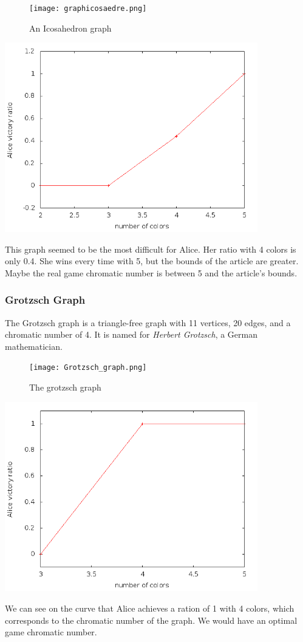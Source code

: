 \begin{figure}[h]
\begin{center}  
	\texttt{[image: graphicosaedre.png]}
\end{center}
    \caption{An Icosahedron graph}
    \label{icograph}
\end{figure}

\includegraphics[width=11cm]{resultats/icosaedre.png}

This graph seemed to be the most difficult for Alice. Her ratio with 4 colors is only 0.4. She wins every time with 5, but the bounds of the article are greater. Maybe the real game chromatic number is between 5 and the article's bounds.

\subsubsection{Grotzsch Graph}

The Grotzsch graph is a triangle-free graph with 11 vertices, 20 edges, and a chromatic number of 4. It is named for \emph{Herbert Grotzsch}, a German mathematician.

\begin{figure}[h]
\begin{center}  
	\texttt{[image: Grotzsch\_graph.png]}
\end{center}
    \caption{The grotzsch graph}
    \label{grograph}
\end{figure}

\includegraphics[width=11cm]{resultats/grotzsch.png}

We can see on the curve that Alice achieves a ration of 1 with 4 colors, which corresponds to the chromatic number of the graph. We would have an optimal game chromatic number.